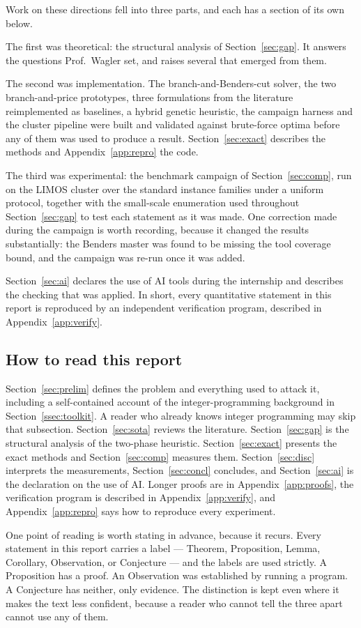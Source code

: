 \noindent
Work on these directions fell into three parts, and each has a section of its own
below.

The first was theoretical: the structural analysis of Section~\ref{sec:gap}. It
answers the questions Prof.~Wagler set, and raises several that emerged from them.

The second was implementation. The branch-and-Benders-cut solver, the two
branch-and-price prototypes, three formulations from the literature reimplemented as
baselines, a hybrid genetic heuristic, the campaign harness and the cluster pipeline
were built and validated against brute-force optima before any of them was used to
produce a result. Section~\ref{sec:exact} describes the methods and
Appendix~\ref{app:repro} the code.

The third was experimental: the benchmark campaign of Section~\ref{sec:comp}, run on
the LIMOS cluster over the standard instance families under a uniform protocol,
together with the small-scale enumeration used throughout Section~\ref{sec:gap} to
test each statement as it was made. One correction made during the campaign is worth
recording, because it changed the results substantially: the Benders master was found
to be missing the tool coverage bound, and the campaign was re-run once it was added.

Section~\ref{sec:ai} declares the use of AI tools during the internship and describes
the checking that was applied. In short, every quantitative statement in this report
is reproduced by an independent verification program, described in
Appendix~\ref{app:verify}.

\subsection{How to read this report}\label{ssec:intro-read}

Section~\ref{sec:prelim} defines the problem and everything used to attack it,
including a self-contained account of the integer-programming background in
Section~\ref{ssec:toolkit}. A reader who already knows integer programming may skip
that subsection. Section~\ref{sec:sota} reviews the literature.
Section~\ref{sec:gap} is the structural analysis of the two-phase heuristic.
Section~\ref{sec:exact} presents the exact methods and Section~\ref{sec:comp}
measures them. Section~\ref{sec:disc} interprets the measurements,
Section~\ref{sec:concl} concludes, and Section~\ref{sec:ai} is the declaration on
the use of AI. Longer proofs are in Appendix~\ref{app:proofs}, the verification
program is described in Appendix~\ref{app:verify}, and Appendix~\ref{app:repro}
says how to reproduce every experiment.

One point of reading is worth stating in advance, because it recurs. Every
statement in this report carries a label --- Theorem, Proposition, Lemma, Corollary,
Observation, or Conjecture --- and the labels are used strictly. A Proposition has a
proof. An Observation was established by running a program. A Conjecture has neither,
only evidence. The distinction is kept even where it makes the text less confident,
because a reader who cannot tell the three apart cannot use any of them.
